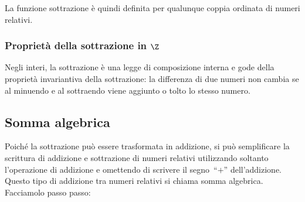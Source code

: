 La funzione sottrazione è quindi definita per qualunque coppia ordinata di 
numeri relativi.

\vspace{1em}


\subsubsection{Proprietà della sottrazione in $\Z$}

Negli interi, la sottrazione è una legge di composizione interna e gode della 
proprietà invariantiva della sottrazione:
la differenza di due numeri non cambia se al minuendo e al sottraendo viene 
aggiunto o tolto lo stesso numero.

\subsection{Somma algebrica}

Poiché la sottrazione può essere trasformata in addizione, si può 
semplificare la scrittura di addizione e sottrazione di numeri relativi 
utilizzando soltanto l'operazione di addizione e omettendo di scrivere
il segno~``\(+\)'' dell'addizione. 
Questo tipo di addizione tra numeri relativi si chiama somma algebrica.
Facciamolo passo passo:

